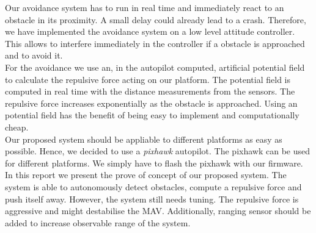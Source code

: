 Our avoidance system has to run in real time and immediately react to an obstacle in its proximity. A small delay could already lead to a crash. Therefore, we have implemented the avoidance system on a low level attitude controller. This allows to interfere immediately in the controller if a obstacle is approached and to avoid it.\\
For the avoidance we use an, in the autopilot computed, artificial potential field to calculate the repulsive force acting on our platform. The potential field is computed in real time with the distance measurements from the sensors. The repulsive force increases exponentially as the obstacle is approached. Using an potential field has the benefit of being easy to implement and computationally cheap.\\
Our proposed system should be appliable to different platforms as easy as possible. Hence, we decided to use a \textit{pixhawk} autopilot. The pixhawk can be used for different platforms. We simply have to flash the pixhawk with our firmware.\\
In this report we present the prove of concept of our proposed system. The system is able to autonomously detect obstacles, compute a repulsive force and push itself away. However, the system still needs tuning. The repulsive force is aggressive and might destabilise the MAV. Additionally, ranging sensor should be added to increase observable range of the system.
